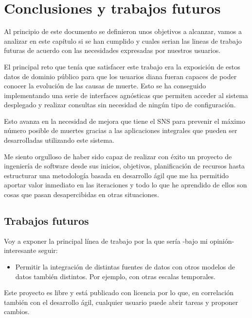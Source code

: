 \chapter{Conclusiones y trabajos futuros}
Al principio de este documento se definieron unos objetivos a alcanzar, vamos a analizar
en este capítulo si se han cumplido y cuales serian las lineas de trabajo futuras de
acuerdo con las necesidades expresadas por nuestros usuarios.

El principal reto que tenía que satisfacer este trabajo era la exposición de estos datos
de dominio público para que los usuarios diana fueran capaces de poder conocer la
evolución de las causas de muerte. Esto se ha conseguido implementando una serie de
interfaces agnósticas que permiten acceder al sistema desplegado y realizar consultas sin
necesidad de ningún tipo de configuración. 

Esto avanza en la necesidad de mejora que tiene el \Gls{SNS} para prevenir el máximo número
posible de muertes gracias a las aplicaciones integrales que pueden ser desarrolladas
utilizando este sistema.

Me siento orgulloso de haber sido capaz de realizar con éxito un proyecto de ingeniería de
software desde sus inicios, objetivos, planificación de recursos hasta estructurar una
metodología basada en desarrollo ágil que me ha permitido aportar valor inmediato en las
iteraciones y todo lo que he aprendido de ellos son cosas que pasan desapercibidas en otras situaciones.

\section{Trabajos futuros}
Voy a exponer la principal línea de trabajo por la que sería -bajo mi opinión- interesante seguir:
\begin{itemize}
    \item Permitir la integración de distintas fuentes de datos con otros modelos de datos
    también distintos. Por ejemplo, con otras escalas temporales.
\end{itemize}
Este proyecto es libre y está publicado con licencia \cite{gplv3} por lo que, en
correlación también con el desarrollo ágil, cualquier usuario puede abrir tareas y
proponer cambios.